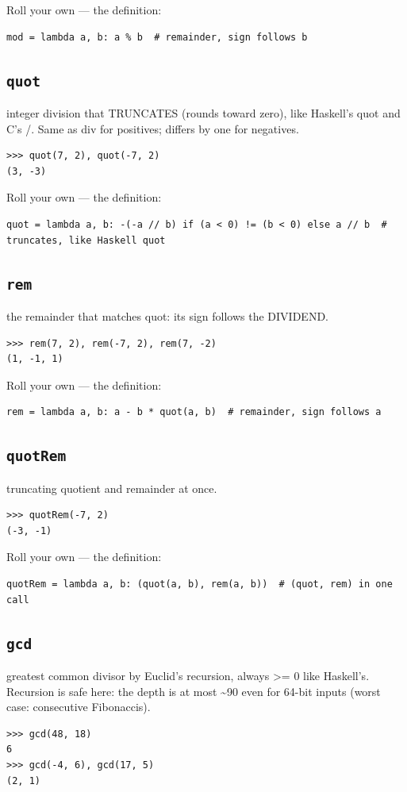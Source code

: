 \documentclass[10pt,letterpaper]{book}
\begin{document}
Roll your own --- the definition:

\begin{lstlisting}[style=ex]
mod = lambda a, b: a % b  # remainder, sign follows b
\end{lstlisting}
\subsection{\texttt{quot}}\label{def:quot}
integer division that TRUNCATES (rounds toward zero), like Haskell's quot and C's /. Same as div for positives; differs by one for negatives.
\begin{lstlisting}[style=ex]
>>> quot(7, 2), quot(-7, 2)
(3, -3)
\end{lstlisting}

Roll your own --- the definition:

\begin{lstlisting}[style=ex]
quot = lambda a, b: -(-a // b) if (a < 0) != (b < 0) else a // b  # truncates, like Haskell quot
\end{lstlisting}
\subsection{\texttt{rem}}\label{def:rem}
the remainder that matches quot: its sign follows the DIVIDEND.
\begin{lstlisting}[style=ex]
>>> rem(7, 2), rem(-7, 2), rem(7, -2)
(1, -1, 1)
\end{lstlisting}

Roll your own --- the definition:

\begin{lstlisting}[style=ex]
rem = lambda a, b: a - b * quot(a, b)  # remainder, sign follows a
\end{lstlisting}
\subsection{\texttt{quotRem}}\label{def:quotRem}
truncating quotient and remainder at once.
\begin{lstlisting}[style=ex]
>>> quotRem(-7, 2)
(-3, -1)
\end{lstlisting}

Roll your own --- the definition:

\begin{lstlisting}[style=ex]
quotRem = lambda a, b: (quot(a, b), rem(a, b))  # (quot, rem) in one call
\end{lstlisting}
\subsection{\texttt{gcd}}\label{def:gcd}
greatest common divisor by Euclid's recursion, always >= 0 like Haskell's. Recursion is safe here: the depth is at most \~{}90 even for 64-bit inputs (worst case: consecutive Fibonaccis).
\begin{lstlisting}[style=ex]
>>> gcd(48, 18)
6
>>> gcd(-4, 6), gcd(17, 5)
(2, 1)
\end{lstlisting}
\end{document}
